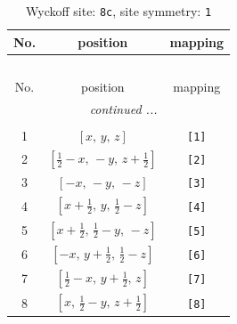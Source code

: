 \documentclass[fleqn,8pt]{jsarticle}
\begin{document}
\renewcommand{\arraystretch}{1.2}
\begin{longtable}{ccc}
\caption{Wyckoff site: {\tt 8c}, site symmetry: {\tt 1}}
 \\
 \hline \hline
No. & position & mapping \\ \hline \endfirsthead

\multicolumn{2}{l}{\tablename\ \thetable{}} \\
 \hline \hline
No. & position & mapping \\ \hline \endhead

 \hline \hline
\multicolumn{2}{r}{\footnotesize\it continued ...} \\ \endfoot

 \hline \hline
\multicolumn{2}{r}{} \\ \endlastfoot

1 & $\left[ x,\, y,\, z \right]$ & {\tt [1]} \\ \hline
2 & $\left[ \frac{1}{2} - x,\, - y,\, z + \frac{1}{2} \right]$ & {\tt [2]} \\ \hline
3 & $\left[ - x,\, - y,\, - z \right]$ & {\tt [3]} \\ \hline
4 & $\left[ x + \frac{1}{2},\, y,\, \frac{1}{2} - z \right]$ & {\tt [4]} \\ \hline
5 & $\left[ x + \frac{1}{2},\, \frac{1}{2} - y,\, - z \right]$ & {\tt [5]} \\ \hline
6 & $\left[ - x,\, y + \frac{1}{2},\, \frac{1}{2} - z \right]$ & {\tt [6]} \\ \hline
7 & $\left[ \frac{1}{2} - x,\, y + \frac{1}{2},\, z \right]$ & {\tt [7]} \\ \hline
8 & $\left[ x,\, \frac{1}{2} - y,\, z + \frac{1}{2} \right]$ & {\tt [8]} \\
\end{longtable}
\end{document}

